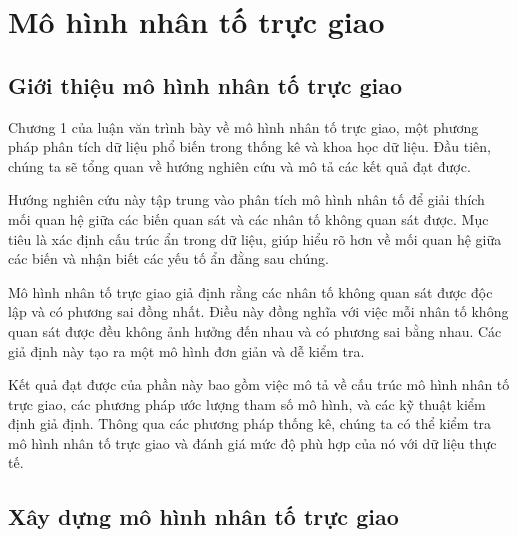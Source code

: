 \chapter{Mô hình nhân tố trực giao}

\section{Giới thiệu mô hình nhân tố trực giao}

Chương 1 của luận văn trình bày về mô hình nhân tố trực giao, một phương pháp phân tích dữ liệu phổ biến trong thống kê và khoa học dữ liệu. Đầu tiên, chúng ta sẽ tổng quan về hướng nghiên cứu và mô tả các kết quả đạt được.

Hướng nghiên cứu này tập trung vào phân tích mô hình nhân tố để giải thích mối quan hệ giữa các biến quan sát và các nhân tố không quan sát được. Mục tiêu là xác định cấu trúc ẩn trong dữ liệu, giúp hiểu rõ hơn về mối quan hệ giữa các biến và nhận biết các yếu tố ẩn đằng sau chúng.


Mô hình nhân tố trực giao giả định rằng các nhân tố không quan sát được độc lập và có phương sai đồng nhất. Điều này đồng nghĩa với việc mỗi nhân tố không quan sát được đều không ảnh hưởng đến nhau và có phương sai bằng nhau. Các giả định này tạo ra một mô hình đơn giản và dễ kiểm tra.

Kết quả đạt được của phần này bao gồm việc mô tả về cấu trúc mô hình nhân tố trực giao, các phương pháp ước lượng tham số mô hình, và các kỹ thuật kiểm định giả định. Thông qua các phương pháp thống kê, chúng ta có thể kiểm tra mô hình nhân tố trực giao và đánh giá mức độ phù hợp của nó với dữ liệu thực tế.

\section{Xây dựng mô hình nhân tố trực giao}

